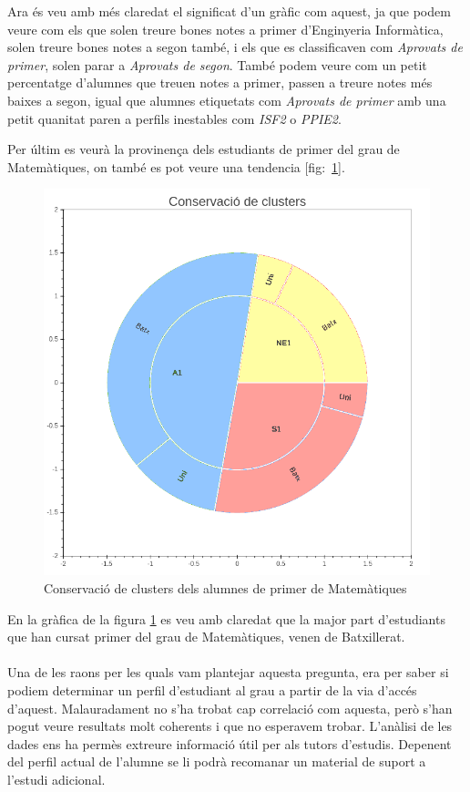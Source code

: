 \documentclass[12pt,a4paper,catalan]{article}
\begin{document}
Ara és veu amb més claredat el significat d'un gràfic com aquest, ja que podem veure com els que solen treure bones notes a primer d'Enginyeria Informàtica, solen treure bones notes a segon també, i els que es classificaven com \textit{Aprovats de primer}, solen parar a \textit{Aprovats de segon}. També podem veure com un petit percentatge d'alumnes que treuen notes a primer, passen a treure notes més baixes a segon, igual que alumnes etiquetats com \textit{Aprovats de primer} amb una petit quanitat paren a perfils inestables com \textit{ISF2} o \textit{PPIE2}.

\newpage

Per últim es veurà la provinença dels estudiants de primer del grau de Matemàtiques, on també es pot veure una tendencia [fig:~\ref{fig:ccm1}].

\begin{figure}[h]
\centering
\includegraphics[width=.6\linewidth]{img/conservacio_clusters_primer_mates.png}
\caption{Conservació de clusters dels alumnes de primer de Matemàtiques}
\label{fig:ccm1}
\end{figure}

En la gràfica de la figura \ref{fig:ccm1} es veu amb claredat que la major part d'estudiants que han cursat primer del grau de Matemàtiques, venen de Batxillerat. 
\\
\\
Una de les raons per les quals vam plantejar aquesta pregunta, era per saber si podiem determinar un perfil d'estudiant al grau a partir de la via d'accés d'aquest. Malauradament no s'ha trobat cap correlació com aquesta, però s'han pogut veure resultats molt coherents i que no esperavem trobar.  L'anàlisi de les dades ens ha permès extreure informació útil per als tutors d'estudis. Depenent del perfil actual de l'alumne se li podrà recomanar un material de suport a l'estudi adicional.
\end{document}
